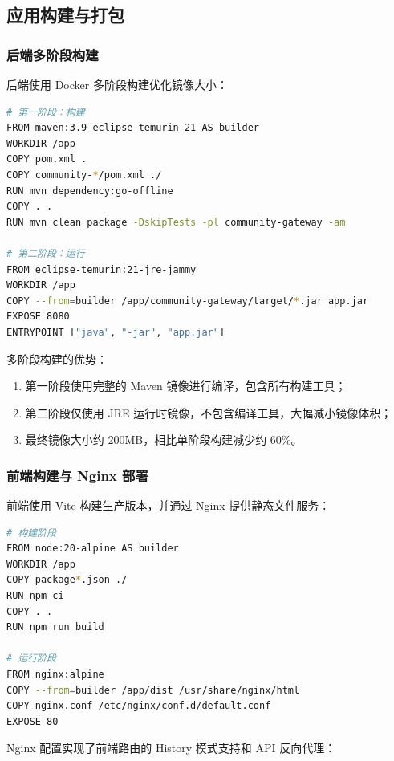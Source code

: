 \subsection{应用构建与打包}

\subsubsection{后端多阶段构建}

后端使用 Docker 多阶段构建优化镜像大小：

\begin{lstlisting}[language=bash, caption=后端 Dockerfile（节选）]
# 第一阶段：构建
FROM maven:3.9-eclipse-temurin-21 AS builder
WORKDIR /app
COPY pom.xml .
COPY community-*/pom.xml ./
RUN mvn dependency:go-offline
COPY . .
RUN mvn clean package -DskipTests -pl community-gateway -am

# 第二阶段：运行
FROM eclipse-temurin:21-jre-jammy
WORKDIR /app
COPY --from=builder /app/community-gateway/target/*.jar app.jar
EXPOSE 8080
ENTRYPOINT ["java", "-jar", "app.jar"]
\end{lstlisting}

多阶段构建的优势：

\begin{enumerate}
  \item 第一阶段使用完整的 Maven 镜像进行编译，包含所有构建工具；
  \item 第二阶段仅使用 JRE 运行时镜像，不包含编译工具，大幅减小镜像体积；
  \item 最终镜像大小约 200MB，相比单阶段构建减少约 60\%。
\end{enumerate}

\subsubsection{前端构建与 Nginx 部署}

前端使用 Vite 构建生产版本，并通过 Nginx 提供静态文件服务：

\begin{lstlisting}[language=bash, caption=前端 Dockerfile（节选）]
# 构建阶段
FROM node:20-alpine AS builder
WORKDIR /app
COPY package*.json ./
RUN npm ci
COPY . .
RUN npm run build

# 运行阶段
FROM nginx:alpine
COPY --from=builder /app/dist /usr/share/nginx/html
COPY nginx.conf /etc/nginx/conf.d/default.conf
EXPOSE 80
\end{lstlisting}

Nginx 配置实现了前端路由的 History 模式支持和 API 反向代理：

